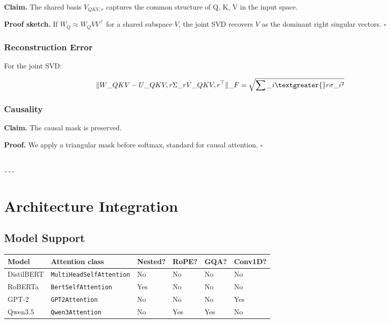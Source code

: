 \textbf{Claim.} The shared basis $V_{QKV, r}$ captures the common structure of Q, 
K, V in the input space.

\textbf{Proof sketch.} If $W_Q \approx W_Q V V^\top$ for a shared subspace $V$, the 
joint SVD recovers $V$ as the dominant right singular vectors. $\square$

\subsubsection{Reconstruction Error}

For the joint SVD:

\[
\|W\_{QKV} - U\_{QKV, r} \Sigma\_r V\_{QKV, r}^\top\|\_F = \sqrt{\sum\_{i \textgreater{} r} \sigma\_i^2}
\]

\subsubsection{Causality}

\textbf{Claim.} The causal mask is preserved.

\textbf{Proof.} We apply a triangular mask before softmax, standard for causal 
attention. $\square$
\begin{lstlisting}

---
\end{lstlisting}

\section{Architecture Integration}

\subsection{Model Support}

\begin{table}[H]
\centering
\small
\begin{tabular}{llllll}
\toprule
\textbf{Model} & \textbf{Attention class} & \textbf{Nested?} & \textbf{RoPE?} & \textbf{GQA?} & \textbf{Conv1D?} \\
\midrule
DistilBERT & \texttt{MultiHeadSelfAttention} & No & No & No & No \\
RoBERTa & \texttt{BertSelfAttention} & Yes & No & No & No \\
GPT-2 & \texttt{GPT2Attention} & No & No & No & Yes \\
Qwen3.5 & \texttt{Qwen3Attention} & No & Yes & Yes & No \\
\bottomrule
\end{tabular}
\end{table}

